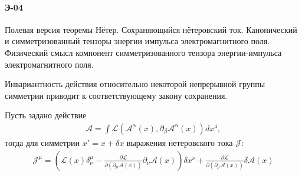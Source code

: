 \documentclass[__main__.tex]{subfiles}
\begin{document}
\paragraph{Э-04}
Полевая версия теоремы Нётер. Сохраняющийся нётеровский ток. Канонический и симметризованный тензоры энергии импульса электромагнитного поля. Физический смысл компонент симметризованного тензора энергии-импульса электромагнитного поля.\\

\begin{theorem}[Нётер]
    Инвариантность действия относительно некоторой непрерывной группы симметрии приводит к соответствующему закону сохранения.
\end{theorem}

Пусть задано действие
\begin{gather}
    \mathcal{A}=\int\mathcal{L}\left( \mathcal{A}^\alpha (x),\partial_\beta \mathcal{A}^\alpha(x)\right)dx^4,
\end{gather}
тогда для симметрии $x\prime=x+\delta x$ выражения нетеровского тока $\mathcal{J}$:
\begin{gather}
\mathcal{J}^\mu
=
\left(\mathcal{L}(x)\delta_\nu^\mu-\frac{\partial \mathcal{L}}{\partial (\partial_\mu\mathcal{A}(x))}\partial_\nu\mathcal{A}(x)\right)\delta x^\nu+\frac{\partial\mathcal{L}}{\partial(\partial_\mu\mathcal{A}(x))}\delta\mathcal{A}(x)
\end{gather}
\end{document}
